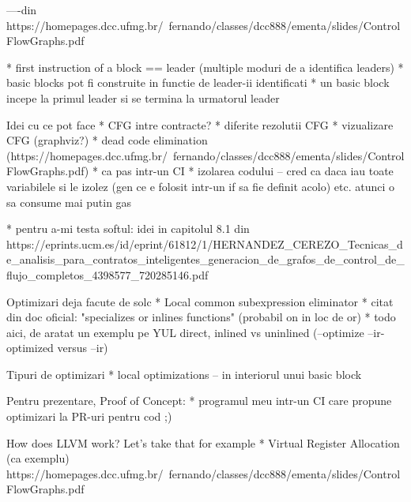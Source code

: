 ----din https://homepages.dcc.ufmg.br/~fernando/classes/dcc888/ementa/slides/ControlFlowGraphs.pdf

* first instruction of a block == leader (multiple moduri de a identifica leaders)
* basic blocks pot fi construite in functie de leader-ii identificati
  * un basic block incepe la primul leader si se termina la urmatorul leader

Idei cu ce pot face
* CFG intre contracte?
* diferite rezolutii CFG
* vizualizare CFG (graphviz?)
* dead code elimination (https://homepages.dcc.ufmg.br/~fernando/classes/dcc888/ementa/slides/ControlFlowGraphs.pdf)
  * ca pas intr-un CI
* izolarea codului – cred ca daca iau toate variabilele si le izolez (gen ce e folosit intr-un if sa fie definit acolo) etc. atunci o sa consume mai putin gas
  
* pentru a-mi testa softul: idei in capitolul 8.1 din https://eprints.ucm.es/id/eprint/61812/1/HERNANDEZ_CEREZO_Tecnicas_de_analisis_para_contratos_inteligentes_generacion_de_grafos_de_control_de_flujo_completos_4398577_720285146.pdf

Optimizari deja facute de solc
* Local common subexpression eliminator
* citat din doc oficial: "specializes or inlines functions" (probabil on in loc de or)
  * todo aici, de aratat un exemplu pe YUL direct, inlined vs uninlined (--optimize --ir-optimized versus --ir)


Tipuri de optimizari
* local optimizations – in interiorul unui basic block

Pentru prezentare, Proof of Concept:
* programul meu intr-un CI care propune optimizari la PR-uri pentru cod ;)


How does LLVM work? Let's take that for example
* Virtual Register Allocation (ca exemplu)
https://homepages.dcc.ufmg.br/~fernando/classes/dcc888/ementa/slides/ControlFlowGraphs.pdf